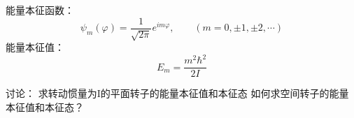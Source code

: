\begin{frame} 
    能量本征函数： $$\psi_m(\varphi)=\frac{1}{\sqrt{2\pi}}e^{im\varphi}, \qquad (m=0,\pm 1, \pm 2, \cdots)$$
    能量本征值： $$ E_m=\frac{m^2\hbar^2}{2I} $$ 
    
\end{frame}

\begin{frame}    
    \begin{tcolorbox2}{讨论：}
        求转动惯量为I的平面转子的能量本征值和本征态 如何求空间转子的能量本征值和本征态？  
    \end{tcolorbox2}
\end{frame}